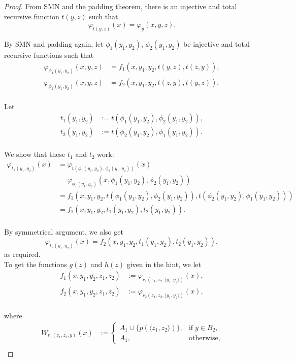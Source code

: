 \documentclass{article}
\begin{document}
\begin{enumerate}[label={\bf Q\arabic*:}]
\begin{proof}
      From SMN and the padding theorem, there is an injective and total
      recursive function $t(y,z)$ such that
      \[\varphi_{t(y,z)}(x) =\varphi_y(x,y,z).\]

      By SMN and padding again, let $\phi_1(y_1,y_2)$, $\phi_2(y_1,y_2)$ be
      injective and total recursive functions such that
      \begin{align*}
        \varphi_{\phi_1(y_1,y_2)}(x,y,z) &=f_1(x,y_1,y_2,t(y,z),t(z,y)),\\
        \varphi_{\phi_2(y_1,y_2)}(x,y,z) &=f_2(x,y_1,y_2,t(z,y),t(y,z)).\\
      \end{align*}

      Let
      \begin{align*}
        t_1(y_1,y_2) &:=t(\phi_1(y_1,y_2),\phi_2(y_1,y_2)),\\
        t_2(y_1,y_2) &:=t(\phi_2(y_1,y_2),\phi_1(y_1,y_2)).\\
      \end{align*}

      We show that these $t_1$ and $t_2$ work:
      \begin{align*}
        \varphi_{t_1(y_1,y_2)}(x)
          &=\varphi_{t(\phi_1(y_1,y_2),\phi_2(y_1,y_2))}(x)\\
        &=\varphi_{\phi_1(y_1,y_2)} (x,\phi_1(y_1,y_2),\phi_2(y_1,y_2))\\
        &=f_1(x,y_1,y_2, t(\phi_1(y_1,y_2),\phi_2(y_1,y_2)),
          t(\phi_2(y_1,y_2),\phi_1(y_1,y_2)))\\
        &=f_1(x,y_1,y_2,t_1(y_1,y_2),t_2(y_1,y_2)).\\
      \end{align*}

      By symmetrical argument, we also get
      \[\varphi_{t_2(y_1,y_2)}(x) =f_2(x,y_1,y_2,t_1(y_1,y_2),t_2(y_1,y_2)),\]
      as required. \\

      To get the functions $g(z)$ and $h(z)$ given in the hint, we let
      \begin{align*}
        f_1(x,y_1,y_2,z_1,z_2) &:=\varphi_{r_1(z_1,z_2,\langle
          y_1,y_2\rangle)}(x),\\
        f_2(x,y_1,y_2,z_1,z_2) &:=\varphi_{r_2(z_1,z_2,\langle
          y_1,y_2\rangle)}(x),\\
      \end{align*}

      where
      \begin{align*}
        W_{r_1(z_1,z_2,y)}(x) &:=
        \begin{cases}
          A_1\cup\{p(\langle z_1,z_2\rangle)\}, &\text{if}\; y\in B_2,\\
          A_1, &\text{otherwise},
        \end{cases}\\
      \end{align*}


\end{proof}
\end{enumerate}
\end{document}
